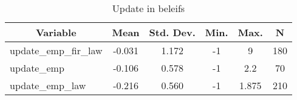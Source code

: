 
\begin{table}[htbp]\centering \caption{Update in beleifs \label{sumstat}}
\begin{tabular}{l c c c c c}\hline\hline
\multicolumn{1}{c}{\textbf{Variable}} & \textbf{Mean}
 & \textbf{Std. Dev.}& \textbf{Min.} &  \textbf{Max.} & \textbf{N}\\ \hline
update\_emp\_fir\_law & -0.031 & 1.172 & -1 & 9 & 180\\
update\_emp & -0.106 & 0.578 & -1 & 2.2 & 70\\
update\_emp\_law & -0.216 & 0.560 & -1 & 1.875 & 210\\
\hline\end{tabular}
\end{table}
